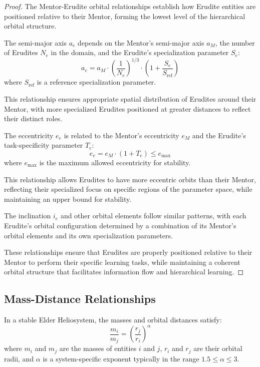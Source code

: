 \begin{proof}
The Mentor-Erudite orbital relationships establish how Erudite entities are positioned relative to their Mentor, forming the lowest level of the hierarchical orbital structure.

The semi-major axis $a_e$ depends on the Mentor's semi-major axis $a_M$, the number of Erudites $N_e$ in the domain, and the Erudite's specialization parameter $S_e$:
\begin{equation}
a_e = a_M \cdot \left(\frac{1}{N_e}\right)^{1/3} \cdot \left(1 + \frac{S_e}{S_{\text{ref}}}\right)
\end{equation}
where $S_{\text{ref}}$ is a reference specialization parameter.

This relationship ensures appropriate spatial distribution of Erudites around their Mentor, with more specialized Erudites positioned at greater distances to reflect their distinct roles.

The eccentricity $e_e$ is related to the Mentor's eccentricity $e_M$ and the Erudite's task-specificity parameter $T_e$:
\begin{equation}
e_e = e_M \cdot (1 + T_e) \leq e_{\text{max}}
\end{equation}
where $e_{\text{max}}$ is the maximum allowed eccentricity for stability.

This relationship allows Erudites to have more eccentric orbits than their Mentor, reflecting their specialized focus on specific regions of the parameter space, while maintaining an upper bound for stability.

The inclination $i_e$ and other orbital elements follow similar patterns, with each Erudite's orbital configuration determined by a combination of its Mentor's orbital elements and its own specialization parameters.

These relationships ensure that Erudites are properly positioned relative to their Mentor to perform their specific learning tasks, while maintaining a coherent orbital structure that facilitates information flow and hierarchical learning.
\end{proof}

\subsection{Mass-Distance Relationships}

\begin{theorem}
In a stable Elder Heliosystem, the masses and orbital distances satisfy:
\begin{equation}
\frac{m_i}{m_j} = \left(\frac{r_j}{r_i}\right)^{\alpha}
\end{equation}
where $m_i$ and $m_j$ are the masses of entities $i$ and $j$, $r_i$ and $r_j$ are their orbital radii, and $\alpha$ is a system-specific exponent typically in the range $1.5 \leq \alpha \leq 3$.
\end{theorem}

